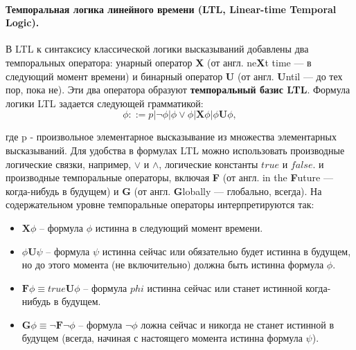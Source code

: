 \paragraph{\textbf{Темпоральная логика} линейного времени (LTL, Linear-time Temporal Logic).} 
\text{}
\newline
В LTL к синтаксису классической логики высказываний добавлены два темпоральных оператора: унарный оператор \textbf{X} (от англ. ne\textbf{X}t time — в следующий момент времени) и бинарный оператор \textbf{U} (от англ. \textbf{U}ntil — до тех пор, пока не). 
Эти два оператора образуют \textbf{темпоральный базис LTL}. 
Формула логики LTL задается следующей грамматикой:
\begin{equation}
  \phi ::= p | \neg \phi | \phi \vee \phi  |  \textbf{X}\phi | \phi \textbf{U} \phi,
\end{equation}

где p - произвольное элементарное высказывание из множества элементарных высказываний.
Для удобства в формулах LTL можно использовать производные логические связки, например, $\vee$ и $\wedge$, логические константы \textit{$true$}  и  \textit{$false$}. и производные темпоральные операторы, включая \textbf{F} (от англ. in the \textbf{F}uture — когда-нибудь в будущем) и \textbf{G} (от англ. \textbf{G}lobally — глобально, всегда). На содержательном уровне темпоральные операторы интерпретируются так: 

\begin{itemize}
	\item $\textbf{X}\phi$ -- формула $\phi$ истинна в следующий момент времени.
	\item $\phi\textbf{U}\psi$ -- формула $\psi$ истинна сейчас или $\textbf{обязательно}$ будет истинна в $\textbf{будущем}$, но до этого момента (не включительно) должна быть истинна формула $\phi$.
	\item $\textbf{F}\phi \equiv \textit{true} \textbf{U} \phi$ -- формула $phi$ истинна сейчас или станет истинной когда-нибудь в будущем. 
	\item $\textbf{G}\phi \equiv \neg \textbf{F} \neg \phi$ -- формула $\neg \phi$ ложна сейчас и никогда не станет истинной в $\textit{будущем}$ ($\textit{всегда}$, начиная с настоящего момента истинна формула $\psi$).
\end{itemize}



